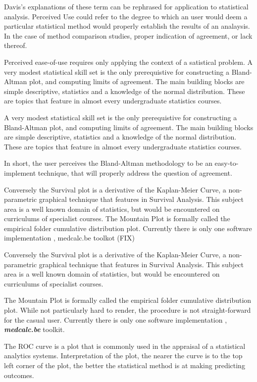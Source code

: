 \documentclass[MAIN.tex]{subfiles}
\begin{document}
Davis's explanations of these term can be rephrased for application to statistical analysis. 
Perceived Use could refer to the degree to which an user would deem a particular statistical method would properly establish the results of an analaysis. In the case of method comparison studies, proper indication of agreement, or lack thereof.


Perceived ease-of-use requires only applying the context of a satistical problem. A very modest statistical skill set is the only prerequistive for constructing a Bland-Altman plot, and computing limits of agreement. The main building blocks 
are simple descriptive, statistics and a knowledge of the normal distribution. These are topics that feature in almost every undergraduate statistics courses.



A very modest statistical skill set is the only prerequistive for constructing a Bland-Altman plot, and computing limits of agreement. The main building blocks 
are simple descriptive, statistics and a knowledge of the normal distribution. These are topics that feature in almost every undergraduate statistics courses.

In short, the user perceives the Bland-Altman methodology to be an easy-to-implement technique, that will properly address the question of agreement.

Conversely the Survival plot is a derivative of the Kaplan-Meier Curve, a non-parametric graphical technique that features in Survival Analysis. This subject area is a well known domain of statistics, but would be encountered 
on curriculums of specialist courses. The Mountain Plot is formally called the empirical folder cumulative distribution plot. 
Currently there is only one software implementation , medcalc.be toolkot (FIX)

Conversely the Survival plot is a derivative of the Kaplan-Meier Curve, a non-parametric graphical technique that features in Survival Analysis. This subject area is a well known domain of statistics, but would be encountered 
on curriculums of specialist courses. 

The Mountain Plot is formally called the empirical folder cumulative distribution plot. While not particularly hard to render, the procedure is not straight-forward for the casual user. Currently there is only one software implementation , \textbf{\textit{medcalc.be}} toolkit.





The ROC curve is a plot that is commonly used in the appraisal of a statistical analytics systems. Interpretation of the plot, the nearer the curve is to the
top left corner of the plot, the better the statistical method is at making predicting outcomes.




\end{document}
